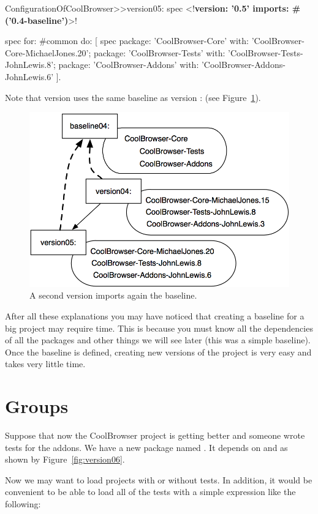 \documentclass[a4paper,10pt,twoside]{book}
\begin{document}
\begin{code}{} 
ConfigurationOfCoolBrowser>>version05: spec 
	<!\textbf{version: '0.5' imports: \#('0.4-baseline')}>!
	
	spec for: #common do: [
		spec 
			package: 'CoolBrowser-Core' with: 'CoolBrowser-Core-MichaelJones.20';
			package: 'CoolBrowser-Tests' with: 'CoolBrowser-Tests-JohnLewis.8';
			package: 'CoolBrowser-Addons' with: 'CoolBrowser-Addons-JohnLewis.6' ].
\end{code}

Note that version  uses the same baseline as version :  (see Figure~\ref{fig:version05}).

\begin{figure}
\begin{center}
\includegraphics[width=0.6\linewidth]{version05}
\caption{A second version imports again the baseline.}\label{fig:version05}
\end{center}
\end{figure} 

After all these explanations you may have noticed that creating a baseline for a big project may require time. This is because you must know all the dependencies of all the packages and other things we will see later (this was a simple baseline). Once the baseline is defined, creating new versions of the project is very easy and takes very little time. 

\section{Groups}
Suppose that now the CoolBrowser project is getting better and someone wrote tests for the addons. We have a new package named . It depends on  and  as shown by Figure~\ref{fig:version06}.

Now we may want to load projects with or without tests. In addition, it would be convenient to be able to load all of the tests with a simple expression like the following:
\end{document}
